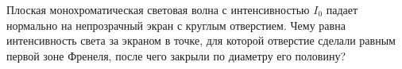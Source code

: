 \documentclass[__main__.tex]{subfiles}
\begin{document}
Плоская монохроматическая световая волна с интенсивностью $I_0$ падает нормально на непрозрачный экран с круглым отверстием. Чему равна интенсивность света за экраном в точке, для которой отверстие сделали равным первой зоне Френеля, после чего закрыли по диаметру его половину?\\ 

\end{document}
